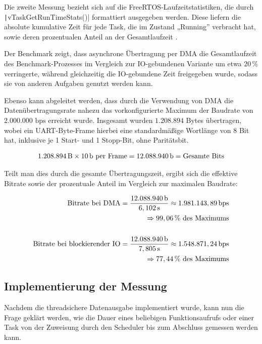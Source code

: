 Die zweite Messung bezieht sich auf die FreeRTOS-Laufzeitstatistiken, die durch
\linebreak \texttt|vTaskGetRunTimeStats()| formattiert ausgegeben
werden. Diese liefern die absolute kumulative Zeit für jede Task, die im Zustand
„Running” verbracht hat, sowie deren prozentualen Anteil an der Gesamtlaufzeit
\cite{freertos_runtime_stats}.

Der Benchmark zeigt, dass asynchrone Übertragung per DMA die Gesamtlaufzeit des
Benchmark-Prozesses im Vergleich zur IO-gebundenen Variante um etwa $20\,\%$
verringerte, während gleichzeitig die IO-gebundene Zeit freigegeben wurde,
sodass sie von anderen Aufgaben genutzt werden kann.

Ebenso kann abgeleitet werden, dass durch die Verwendung von DMA die
Datenübertragungsrate nahezu das vorkonfigurierte Maximum der Baudrate von
$2.000.000\text{ bps}$ erreicht wurde. Insgesamt wurden $1.208.894$ Bytes
übertragen, wobei ein UART-Byte-Frame hierbei eine standardmäßige Wortlänge von
8 Bit hat, inklusive je 1 Start- und 1 Stopp-Bit, ohne Paritätsbit.

\begin{align*}
    1.208.894\text{\,B} \times 10\text{\,b per Frame} =
    12.088.940 \text{\,b} = \text{Gesamte Bits}
\end{align*}

Teilt man dies durch die gesamte Übertragungszeit, ergibt sich die effektive
Bitrate sowie der prozentuale Anteil im Vergleich zur maximalen Baudrate:

\begin{align*}
    \text{Bitrate bei DMA} =
    \frac{12.088.940\text{\,b}}{6,102\text{\,s}} \approx
    1.981.143,89 \text{\,bps} \\
    \quad \Rightarrow 99,06\,\%\text{ des Maximums} \\
    \\
    \text{Bitrate bei blockierender IO} =
    \frac{12.088.940\text{\,b}}{7,805\text{\,s}} \approx
    1.548.871,24 \text{\,bps} \\
    \quad \Rightarrow 77,44\,\% \text{ des Maximums}
\end{align*}

\subsection{Implementierung der Messung}

Nachdem die threadsichere Datenausgabe implementiert wurde, kann nun die Frage
geklärt werden, wie die Dauer eines beliebigen Funktionsaufrufs oder einer Task
von der Zuweisung durch den Scheduler bis zum Abschluss gemessen werden kann.

